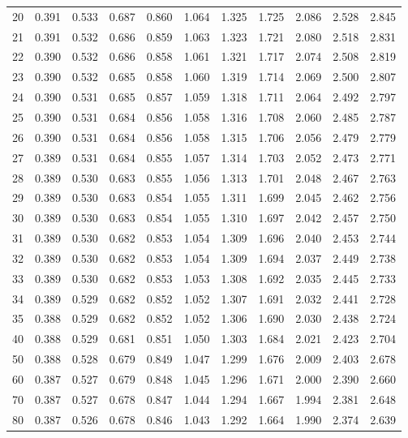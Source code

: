 \begin{center}
\begin{tabular}{|r|*{10}{r}|}
20 & 0.391 & 0.533 & 0.687 & 0.860 & 1.064 & 1.325 & 1.725 & 2.086 & 2.528 & 2.845 \\ 
21 & 0.391 & 0.532 & 0.686 & 0.859 & 1.063 & 1.323 & 1.721 & 2.080 & 2.518 & 2.831 \\ 
22 & 0.390 & 0.532 & 0.686 & 0.858 & 1.061 & 1.321 & 1.717 & 2.074 & 2.508 & 2.819 \\ 
23 & 0.390 & 0.532 & 0.685 & 0.858 & 1.060 & 1.319 & 1.714 & 2.069 & 2.500 & 2.807 \\ 
24 & 0.390 & 0.531 & 0.685 & 0.857 & 1.059 & 1.318 & 1.711 & 2.064 & 2.492 & 2.797 \\ 
25 & 0.390 & 0.531 & 0.684 & 0.856 & 1.058 & 1.316 & 1.708 & 2.060 & 2.485 & 2.787 \\ 
26 & 0.390 & 0.531 & 0.684 & 0.856 & 1.058 & 1.315 & 1.706 & 2.056 & 2.479 & 2.779 \\ 
27 & 0.389 & 0.531 & 0.684 & 0.855 & 1.057 & 1.314 & 1.703 & 2.052 & 2.473 & 2.771 \\ 
28 & 0.389 & 0.530 & 0.683 & 0.855 & 1.056 & 1.313 & 1.701 & 2.048 & 2.467 & 2.763 \\ 
29 & 0.389 & 0.530 & 0.683 & 0.854 & 1.055 & 1.311 & 1.699 & 2.045 & 2.462 & 2.756 \\ 
30 & 0.389 & 0.530 & 0.683 & 0.854 & 1.055 & 1.310 & 1.697 & 2.042 & 2.457 & 2.750 \\ 
31 & 0.389 & 0.530 & 0.682 & 0.853 & 1.054 & 1.309 & 1.696 & 2.040 & 2.453 & 2.744 \\ 
32 & 0.389 & 0.530 & 0.682 & 0.853 & 1.054 & 1.309 & 1.694 & 2.037 & 2.449 & 2.738 \\ 
33 & 0.389 & 0.530 & 0.682 & 0.853 & 1.053 & 1.308 & 1.692 & 2.035 & 2.445 & 2.733 \\ 
34 & 0.389 & 0.529 & 0.682 & 0.852 & 1.052 & 1.307 & 1.691 & 2.032 & 2.441 & 2.728 \\ 
35 & 0.388 & 0.529 & 0.682 & 0.852 & 1.052 & 1.306 & 1.690 & 2.030 & 2.438 & 2.724 \\ 
40 & 0.388 & 0.529 & 0.681 & 0.851 & 1.050 & 1.303 & 1.684 & 2.021 & 2.423 & 2.704 \\ 
50 & 0.388 & 0.528 & 0.679 & 0.849 & 1.047 & 1.299 & 1.676 & 2.009 & 2.403 & 2.678 \\ 
60 & 0.387 & 0.527 & 0.679 & 0.848 & 1.045 & 1.296 & 1.671 & 2.000 & 2.390 & 2.660 \\ 
70 & 0.387 & 0.527 & 0.678 & 0.847 & 1.044 & 1.294 & 1.667 & 1.994 & 2.381 & 2.648 \\ 
80 & 0.387 & 0.526 & 0.678 & 0.846 & 1.043 & 1.292 & 1.664 & 1.990 & 2.374 & 2.639 \\ 

\end{tabular}
\end{center}
